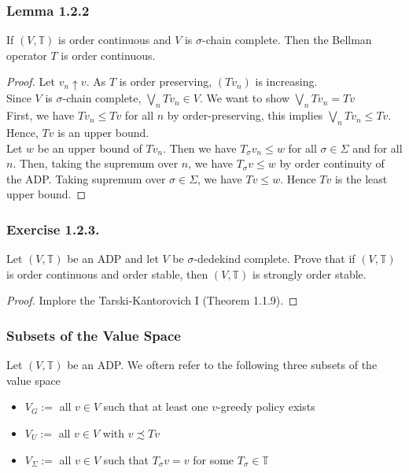 \documentclass[11pt,xcolor={dvipsnames},hyperref={pdftex,pdfpagemode=UseNone,hidelinks,pdfdisplaydoctitle=true},usepdftitle=false]{beamer}
\begin{document}
\begin{frame}
\frametitle{Lemma 1.2.2}
\begin{lemma}
If $(V,\mathbb{T})$ is order continuous and $V$ is $\sigma$-chain complete. Then the Bellman operator $T$ is order continuous.
\end{lemma}
\begin{proof}
Let $v_n\uparrow v$. As $T$ is order preserving, $(Tv_n)$ is increasing.\\
Since $V$ is $\sigma$-chain complete, $\bigvee_n Tv_n \in V$. We want to show $\bigvee_n Tv_n =Tv$\\
First, we have $Tv_n\le Tv$ for all $n$ by order-preserving, this implies $\bigvee_n Tv_n \le Tv$. Hence, $Tv$ is an upper bound.\\ 
Let $w$ be an upper bound of $Tv_n$. Then we have $T_\sigma v_n \le w$ for all $\sigma\in\Sigma$ and for all $n$. Then, taking the supremum over $n$, we have $T_\sigma v \le w$ by order continuity of the ADP. Taking supremum over $\sigma\in\Sigma$, we have $Tv\le w$. Hence $Tv$ is the least upper bound.
\end{proof}
\end{frame}

\begin{frame}
\frametitle{Exercise 1.2.3.}
Let $(V,\mathbb{T})$ be an ADP and let $V$ be $\sigma$-dedekind complete. Prove that if $(V,\mathbb{T})$ is order continuous and order stable, then $(V,\mathbb{T})$ is strongly order stable.
\begin{proof}
Implore the Tarski-Kantorovich I (Theorem 1.1.9). 
\end{proof}
\end{frame}


\begin{frame}
\frametitle{Subsets of the Value Space}
\begin{definition}
Let $(V,\mathbb{T})$ be an ADP. We oftern refer to the following three subsets of the value space
\begin{itemize}
\item $V_G:=$ all $v\in V$ such that at least one $v$-greedy policy exists
\item $V_U:=$ all $v\in V$ with $v\precsim Tv$
\item $V_\Sigma:=$ all $v\in V$ such that $T_\sigma v=v$ for some $T_\sigma\in\mathbb{T}$
\end{itemize}
\end{definition}
\end{frame}
\end{document}
